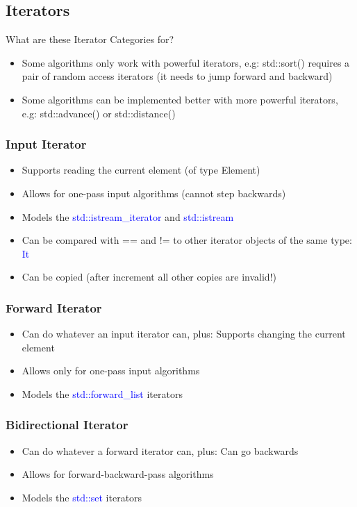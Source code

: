 \subsection{Iterators}
What are these Iterator Categories for?
\begin{itemize}
    \item Some algorithms only work with powerful iterators, e.g: std::sort() requires a pair of random access iterators (it needs to jump forward and backward)
    \item Some algorithms can be implemented better with more powerful iterators, e.g: std::advance() or std::distance()
\end{itemize}
\subsubsection{Input Iterator}
\begin{itemize}
    \item Supports reading the current element (of type Element)
    \item Allows for one-pass input algorithms (cannot step backwards)
    \item Models the \textcolor{blue}{std::istream\_iterator} and \textcolor{blue}{std::istream}
    \item Can be compared with == and != to other iterator objects of the same type: \textcolor{blue}{It}
    \item Can be copied (after increment all other copies are invalid!)
\end{itemize}
\subsubsection{Forward Iterator}
\begin{itemize}
    \item Can do whatever an input iterator can, plus: Supports changing the current element
    \item Allows only for one-pass input algorithms
    \item Models the \textcolor{blue}{std::forward\_list} iterators
\end{itemize}
\subsubsection{Bidirectional Iterator}
\begin{itemize}
    \item Can do whatever a forward iterator can, plus: Can go backwards
    \item Allows for forward-backward-pass algorithms
    \item Models the \textcolor{blue}{std::set} iterators
\end{itemize}

